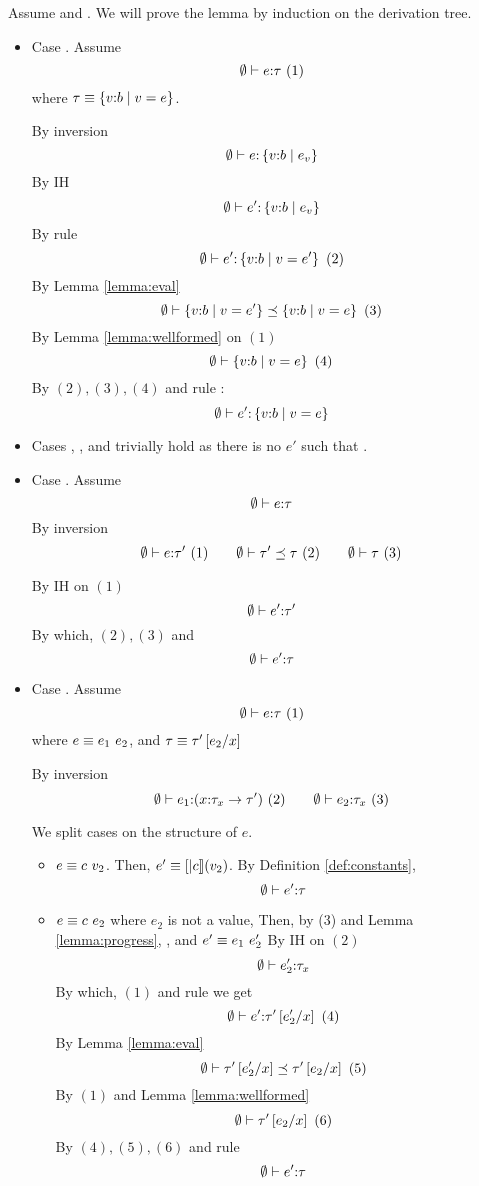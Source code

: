 Assume  and . 
We will prove the lemma by induction on the derivation tree. 
\begin{itemize}
\item Case \rtexact. Assume $$\hastype{\emptyset}{e}{\tau}\ (1)$$
where $\tau \equiv\tref{v}{b}{v = e}$.

By inversion
$$\hastype{\emptyset}{e}{\tref{v}{b}{e_v}}$$
By IH
$$\hastype{\emptyset}{e'}{\tref{v}{b}{e_v}}$$
By rule \rtexact
$$\hastype{\emptyset}{e'}{\tref{v}{b}{v=e'}} \ (2)$$
By Lemma \ref{lemma:eval}
$$\issubtype{\emptyset}{\tref{v}{b}{v=e'}}{\tref{v}{b}{v=e}} \ (3)$$
By Lemma \ref{lemma:wellformed} on $(1)$
$$\iswellformed{\emptyset}{\tref{v}{b}{v=e}} \ (4)$$
By $(2), (3), (4)$ and rule \rtsub:
$$\hastype{\emptyset}{e'}{\tref{v}{b}{v=e}}$$

\item Cases \rtvarbase, \rtvar, \rtconst and \rtfun trivially hold
       as there is no $e'$ such that .

\item Case \rtsub. Assume
$$	\hastype{\emptyset}{e}{\tau}$$
By inversion
$$	\hastype{\emptyset}{e}{\tau'} \ (1) \qquad
	\issubtype{\emptyset}{\tau'}{\tau}\ (2) \qquad
	\iswellformed{\emptyset}{\tau}\ (3)
$$

By IH on $(1)$
$$	\hastype{\emptyset}{e'}{\tau'} $$
By which, $(2), (3)$ and \rtsub
$$	\hastype{\emptyset}{e'}{\tau}$$


\item Case \rtapp. Assume
$$	\hastype{\emptyset}{e}{\tau}\ (1)$$
where $e \equiv \eapp{e_1}{e_2}$, and
	  $\tau\equiv\tau'\sub{x}{e_2}$

By inversion
$$	
	\hastype{\emptyset}{e_1}{(\tfun{x}{\tau_{x}}{\tau'})}\ (2) \qquad
	\hastype{\emptyset}{e_2}{\tau_{x}}\ (3)
$$

We split cases on the structure of $e$.
\begin{itemize}
\item $e\equiv \eapp{c}{v_2}$.
Then, $e'\equiv\interp{c}(v_2)$.
By Definition \ref{def:constants},
$$\hastype{\emptyset}{e'}{\tau}$$

\item $e\equiv \eapp{c}{e_2}$ where $e_2$ is not a value, 
Then, by (3) and Lemma \ref{lemma:progress},
, and $e' \equiv \eapp{e_1}{e_2'}$
%
By IH on $(2)$
$$	\hastype{\emptyset}{e_2'}{\tau_{x}}$$
By which, $(1)$ and rule \rtapp we get
$$\hastype{\emptyset}{e'}{\tau'\sub{x}{e_2'}}\ (4)$$
By Lemma \ref{lemma:eval}
$$
	\issubtype{\emptyset}{\tau'\sub{x}{e_2'}}{\tau'\sub{x}{e_2}}\ (5)
$$
By $(1)$ and Lemma \ref{lemma:wellformed}
$$
	\iswellformed{\emptyset}{\tau'\sub{x}{e_2}}\ (6)
$$
By $(4), (5), (6)$ and rule \rtsub
$$	\hastype{\emptyset}{e'}{\tau}$$


\end{itemize}
\end{itemize}
